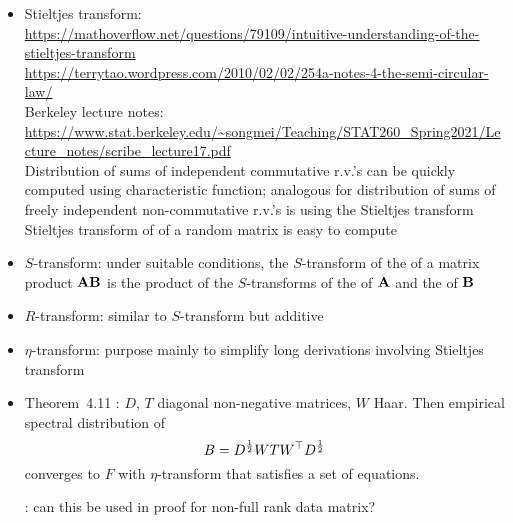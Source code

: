 \documentclass[10pt]{article}
\begin{document}
\begin{itemize}

\item
Stieltjes transform: \\
\url{https://mathoverflow.net/questions/79109/intuitive-understanding-of-the-stieltjes-transform} \\
\url{https://terrytao.wordpress.com/2010/02/02/254a-notes-4-the-semi-circular-law/} \\
Berkeley lecture notes: \url{https://www.stat.berkeley.edu/~songmei/Teaching/STAT260_Spring2021/Lecture_notes/scribe_lecture17.pdf} \\
Distribution of sums of independent commutative r.v.'s can be quickly computed using characteristic function; analogous for distribution of sums of freely independent non-commutative r.v.'s is using the Stieltjes transform \\
Stieltjes transform of \esd of a random matrix is easy to compute \citep{Couillet:2011}

\item
$S$-transform: under suitable conditions, the $S$-transform of the \lsd of a matrix product $\mathbf{A}\mathbf{B}$ is the product of the $S$-transforms of the \lsd of $\mathbf{A}$ and the \lsd of $\mathbf{B}$ \citep{Couillet:2011}

\item
$R$-transform: similar to $S$-transform but additive

\item
$\eta$-transform: purpose mainly to simplify long derivations involving Stieltjes transform \citep{Couillet:2011}

\item
Theorem~4.11 \citep{Couillet:2011_free}: $D$, $T$ diagonal non-negative matrices, $W$ Haar. Then empirical spectral distribution of
\[
B=D^\frac{1}{2}WTW^\top D^\frac{1}{2}
\]
converges to $F$ with $\eta$-transform that satisfies a set of equations.

\todo: can this be used in proof for non-full rank data matrix?


\end{itemize}
\end{document}
